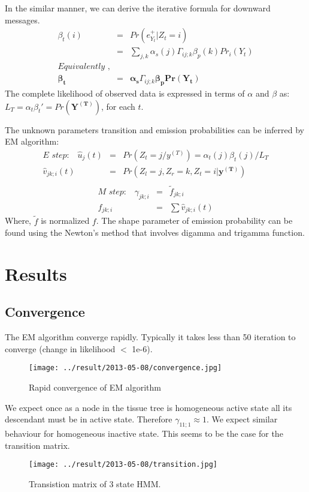 \documentclass{article}
\begin{document}
In the similar manner, we can derive the iterative formula for downward messages. 
\begin{eqnarray}
	\beta_t(i) &=& Pr(e_{Y_t}^+ |Z_t=i) \nonumber\\
	 &=& \sum_{j,k} \alpha_{s}(j) \Gamma_{ij;k} \beta_{p}(k) Pr_i(Y_t) \nonumber\\ 
	 \textit{Equivalently },  \nonumber\\
	 \boldsymbol{\beta_t} &=&   \boldsymbol{\alpha_{s}} \Gamma_{ij;k}  \boldsymbol{\beta_{p} Pr(Y_t)} 
\end{eqnarray}
The complete likelihood of observed data is expressed in terms of $\alpha$ and $\beta$ as:
$ L_T= \alpha_t \beta_t' = Pr(\boldsymbol{Y^{(T)}} )$, for each $t$.   

The unknown parameters transition and emission probabilities can be inferred by EM algorithm:
\begin{eqnarray*}
	\textit{E step:} \quad
	\hat{u}_j(t) &=&  Pr(Z_t =  j/y^{(T)}) = \alpha_t(j) \beta_t(j) /L_T  \\
	\hat{v}_{jk;i}(t) &=&  Pr(Z_{l} = j, Z_{r} = k,  Z_{t} = i | \boldsymbol{y^{(T)}}) \\
\end{eqnarray*}
\begin{eqnarray*}
	  \textit{M step:} \quad
	  \gamma_{jk;i} &=&\tilde{f}_{jk;i} \\
	  f_{jk;i} &=& \sum \hat{v}_{jk;i}(t)
\end{eqnarray*}
Where, $\tilde{f}$ is normalized $f$. The shape parameter of emission probability can be found using the Newton's method that 
involves digamma and trigamma function. 
\section{Results}
\subsection{Convergence}
The EM algorithm converge rapidly. Typically it takes less than 50 iteration to converge (change in likelihood $<$ 1e-6). 
\begin{figure}[htbp]
	\begin{center}
		\texttt{[image: ../result/2013-05-08/convergence.jpg]}
	\end{center}
	\caption{Rapid convergence of EM algorithm}
	\label{fig:convergence}
\end{figure}

We expect once as a node in the tissue tree is homogeneous active state all its descendant must be in active state. 
Therefore $\gamma_{11;1} \approx 1$. We expect similar behaviour for homogeneous inactive state. This seems to be the 
case for the transition matrix.
\begin{figure}[h]
	\begin{center}
		\texttt{[image: ../result/2013-05-08/transition.jpg]}
	\end{center}
	\caption{Transistion matrix of 3 state HMM.}
	\label{fig:transistion}
\end{figure}
\end{document}
